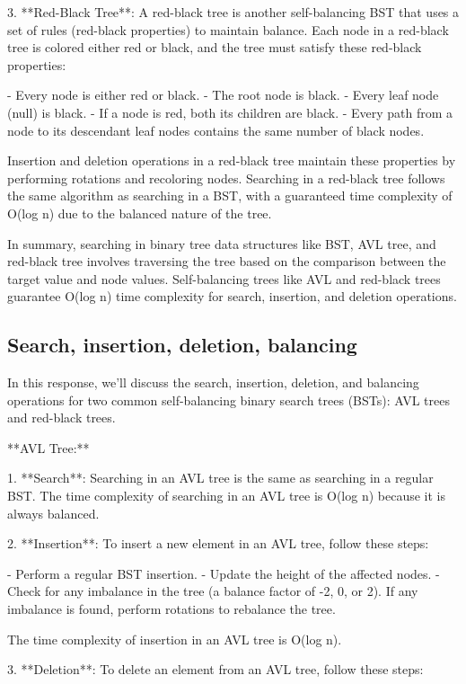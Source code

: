 \documentclass{article}
\begin{document}
3. **Red-Black Tree**: A red-black tree is another self-balancing BST that uses a set of rules (red-black properties) to maintain balance. Each node in a red-black tree is colored either red or black, and the tree must satisfy these red-black properties:

   - Every node is either red or black.
   - The root node is black.
   - Every leaf node (null) is black.
   - If a node is red, both its children are black.
   - Every path from a node to its descendant leaf nodes contains the same number of black nodes.

   Insertion and deletion operations in a red-black tree maintain these properties by performing rotations and recoloring nodes. Searching in a red-black tree follows the same algorithm as searching in a BST, with a guaranteed time complexity of O(log n) due to the balanced nature of the tree.

In summary, searching in binary tree data structures like BST, AVL tree, and red-black tree involves traversing the tree based on the comparison between the target value and node values. Self-balancing trees like AVL and red-black trees guarantee O(log n) time complexity for search, insertion, and deletion operations.


\subsection{Search, insertion, deletion, balancing}

In this response, we'll discuss the search, insertion, deletion, and balancing operations for two common self-balancing binary search trees (BSTs): AVL trees and red-black trees.

**AVL Tree:**

1. **Search**: Searching in an AVL tree is the same as searching in a regular BST. The time complexity of searching in an AVL tree is O(log n) because it is always balanced.

2. **Insertion**: To insert a new element in an AVL tree, follow these steps:

   - Perform a regular BST insertion.
   - Update the height of the affected nodes.
   - Check for any imbalance in the tree (a balance factor of -2, 0, or 2). If any imbalance is found, perform rotations to rebalance the tree.

   The time complexity of insertion in an AVL tree is O(log n).

3. **Deletion**: To delete an element from an AVL tree, follow these steps:
\end{document}
